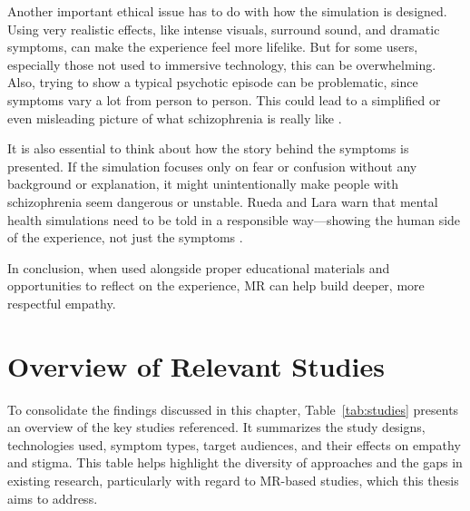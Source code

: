 \vspace{1em}

Another important ethical issue has to do with how the simulation is designed. Using very realistic effects, like intense visuals, surround sound, and dramatic symptoms, can make the experience feel more lifelike. But for some users, especially those not used to immersive technology, this can be overwhelming. Also, trying to show a typical psychotic episode can be problematic, since symptoms vary a lot from person to person. This could lead to a simplified or even misleading picture of what schizophrenia is really like \cite{Zare-Bidaki2022}.

It is also essential to think about how the story behind the symptoms is presented. If the simulation focuses only on fear or confusion without any background or explanation, it might unintentionally make people with schizophrenia seem dangerous or unstable. Rueda and Lara warn that mental health simulations need to be told in a responsible way—showing the human side of the experience, not just the symptoms \cite{Rueda2020}.

\vspace{1em}

In conclusion, when used alongside proper educational materials and opportunities to reflect on the experience, MR can help build deeper, more respectful empathy. 

\section{Overview of Relevant Studies}
To consolidate the findings discussed in this chapter, Table~\ref{tab:studies} presents an overview of the key studies referenced. It summarizes the study designs, technologies used, symptom types, target audiences, and their effects on empathy and stigma. This table helps highlight the diversity of approaches and the gaps in existing research, particularly with regard to MR-based studies, which this thesis aims to address.

